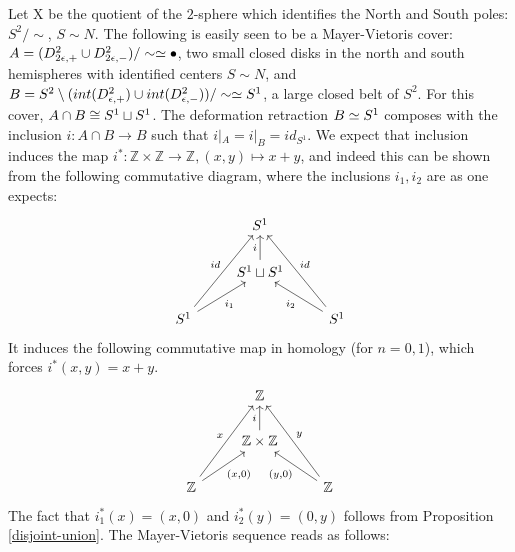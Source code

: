 \begin{example}
Let X be the quotient of the $2$-sphere which identifies the North and South poles: $S^2/\sim$, $S \sim N$. The following is easily seen to be a Mayer-Vietoris cover: $A=(D^2_{2\epsilon,+}\cup D^2_{2\epsilon,-})/\sim\simeq \bullet$, two small closed disks in the north and south hemispheres with identified centers $S\sim N$, and $B=S^2\setminus(int(D^2_{\epsilon,+}) \cup int(D^2_{\epsilon,-}))/\sim \simeq S^1$, a large closed belt of $S^2$. For this cover, $A\cap B \cong S^1\sqcup S^1$. The deformation retraction $B\simeq S^1$ composes with the inclusion $i:A\cap B\rightarrow B$ such that $i|_A=i|_B =id_{S^1}$. We expect that inclusion induces the map $i^*:\mathbb{Z}\times \mathbb{Z}\rightarrow \mathbb{Z}, (x,y)\mapsto x+y$, and indeed this can be shown from the following commutative diagram, where the inclusions $i_1,i_2$ are as one expects:
\[\begin{tikzcd}
                                         & S^1                           &                                          \\
                                         & S^1 \sqcup S^1 \arrow[u, "i"] &                                          \\
S^1 \arrow[ru, "i_1"'] \arrow[ruu, "id"] &                               & S^1 \arrow[lu, "i_2"] \arrow[luu, "id"']
\end{tikzcd}\]
It induces the following commutative map in homology (for $n=0,1$), which forces $i^*(x,y)=x+y$.
\[\begin{tikzcd}
                                                   & \mathbb{Z}                                 &                                                    \\
                                                   & \mathbb{Z}\times \mathbb{Z} \arrow[u, "i"] &                                                    \\
\mathbb{Z} \arrow[ru, "{(x,0)}"'] \arrow[ruu, "x"] &                                            & \mathbb{Z} \arrow[lu, "{(y,0)}"] \arrow[luu, "y"']
\end{tikzcd}\]
The fact that $i_1^*(x)=(x,0)$ and $i_2^*(y)=(0,y)$ follows from Proposition \ref{disjoint-union}.
The Mayer-Vietoris sequence reads as follows:


\end{example}
